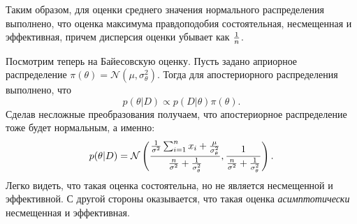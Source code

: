 \begin{example}
Таким образом, для оценки среднего значения нормального распределения выполнено, что
оценка максимума правдоподобия состоятельная, несмещенная и эффективная, причем 
дисперсия оценки убывает как $\frac{1}{n}$.

Посмотрим теперь на Байесовскую оценку.
Пусть задано априорное распределение $\pi(\theta) = \mathcal{N}(\mu, \sigma_{\theta}^2)$.
Тогда для апостериорного распределения выполнено, что
\[
p(\theta | D) \propto p(D| \theta) \pi(\theta).
\] 
Сделав несложные преобразования получаем, что
апостериорное распределение тоже будет нормальным, а именно:
\[
p(\theta | D) = \mathcal{N} \left(\frac{\frac{1}{\sigma^2} \sum_{i = 1}^{n} x_i + \frac{\mu}{\sigma_{\theta}^2}}{\frac{n}{\sigma^2} + \frac{1}{\sigma_{\theta}^2}}, \frac{1}{\frac{n}{\sigma^2} + \frac{1}{\sigma_{\theta}^2}} \right).
\] 
Легко видеть, что такая оценка состоятельна, но не является несмещенной и эффективной.
С другой стороны оказывается, что такая оценка \emph{асимптотически} несмещенная и эффективная.
\end{example}

 